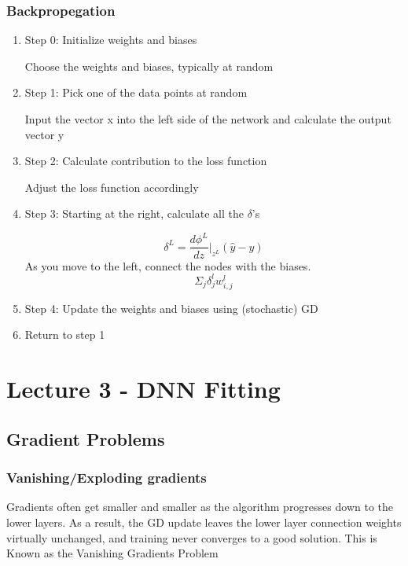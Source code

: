 \documentclass[article]{llncs}
\begin{document}
\subsubsection{Backpropegation}
\begin{enumerate}
    \item[] Step 0: Initialize weights and biases
    
    \hspace*{10mm} Choose the weights and biases, typically at random
    
    \item[] Step 1: Pick one of the data points at random

    \hspace*{10mm} Input the vector x into the left side of the network and calculate the output vector y
    
    \item[] Step 2: Calculate contribution to the loss function

    \hspace*{10mm} Adjust the loss function accordingly
    
    \item[] Step 3: Starting at the right, calculate all the $\delta$'s

    $$
    \delta^{L} = \frac{d\phi^L}{dz} | _{z^L} (\hat{y} - y)
    $$
    As you move to the left, connect the nodes with the biases.
    $$
    \Sigma_j \delta_j^{l} w_{i,j}^l
    $$
    
    \item[] Step 4: Update the weights and biases using (stochastic) GD

    \item[] Return to step 1
    
\end{enumerate}

\section{Lecture 3 - DNN Fitting}
\subsection{Gradient Problems}
\subsubsection{Vanishing/Exploding gradients}
Gradients often get smaller and smaller as the algorithm progresses down to the lower layers. As a result, the GD update leaves the lower layer connection weights virtually unchanged, and training never converges to a good solution. This is Known as the Vanishing Gradients Problem\\
\end{document}
